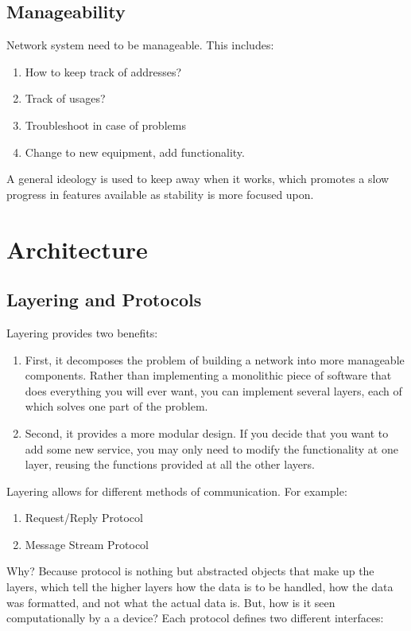 \documentclass[12pt]{book}
\begin{document}
\subsection{Manageability}
Network system need to be manageable. This includes:
\begin{enumerate}
    \item How to keep track of addresses?
    \item Track of usages?
    \item Troubleshoot in case of problems
    \item Change to new equipment, add functionality.
\end{enumerate}

A general ideology is used to keep away when it works, which promotes a slow progress in features available as stability is more focused upon.

\section{Architecture}
\subsection{Layering and Protocols}
Layering provides two benefits:
\begin{enumerate}
    \item First, it decomposes the problem of building a network into more manageable components. Rather than implementing a monolithic piece of software that does everything you will ever want, you can implement several layers, each of which solves one part of the problem. 
    \item Second, it provides a more modular design. If you decide that you want to add some new service, you may only need to modify the functionality at one layer, reusing the functions provided at all the other layers.
\end{enumerate}

Layering allows for different methods of communication. For example:
\begin{enumerate}
    \item Request/Reply Protocol
    \item Message Stream Protocol
\end{enumerate}
Why? Because protocol is nothing but abstracted objects that make up the layers, which tell the higher layers how the data is to be handled, how the data was formatted, and not what the actual data is. But, how is it seen computationally by a a device? Each protocol defines two different interfaces:
\end{document}
